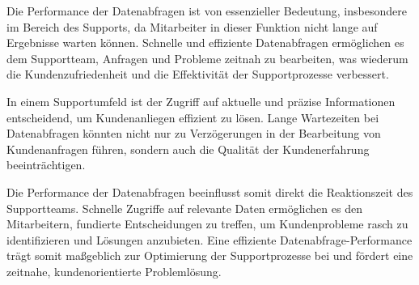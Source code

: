 Die Performance der Datenabfragen ist von essenzieller Bedeutung, insbesondere im Bereich des Supports, da Mitarbeiter in dieser Funktion nicht lange auf Ergebnisse warten können. Schnelle und effiziente Datenabfragen ermöglichen es dem Supportteam, Anfragen und Probleme zeitnah zu bearbeiten, was wiederum die Kundenzufriedenheit und die Effektivität der Supportprozesse verbessert.

In einem Supportumfeld ist der Zugriff auf aktuelle und präzise Informationen entscheidend, um Kundenanliegen effizient zu lösen. Lange Wartezeiten bei Datenabfragen könnten nicht nur zu Verzögerungen in der Bearbeitung von Kundenanfragen führen, sondern auch die Qualität der Kundenerfahrung beeinträchtigen.

Die Performance der Datenabfragen beeinflusst somit direkt die Reaktionszeit des Supportteams. Schnelle Zugriffe auf relevante Daten ermöglichen es den Mitarbeitern, fundierte Entscheidungen zu treffen, um Kundenprobleme rasch zu identifizieren und Lösungen anzubieten. Eine effiziente Datenabfrage-Performance trägt somit maßgeblich zur Optimierung der Supportprozesse bei und fördert eine zeitnahe, kundenorientierte Problemlösung.